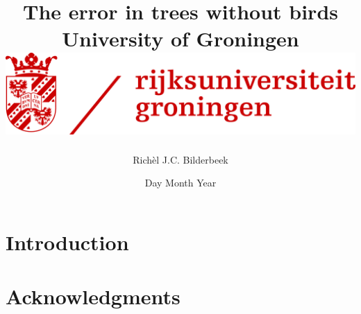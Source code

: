\documentclass[12pt]{report}
\title{
  {The error in trees without birds} \\
  {\large University of Groningen} \\
  {\includegraphics[width=\textwidth]{rugr_logonl_rood_rgb.jpg}}
}
\author{Rich\`el J.C. Bilderbeek}
\date{Day Month Year}
\begin{document}
\maketitle

\chapter{Introduction}


\chapter{Acknowledgments}


\end{document}
